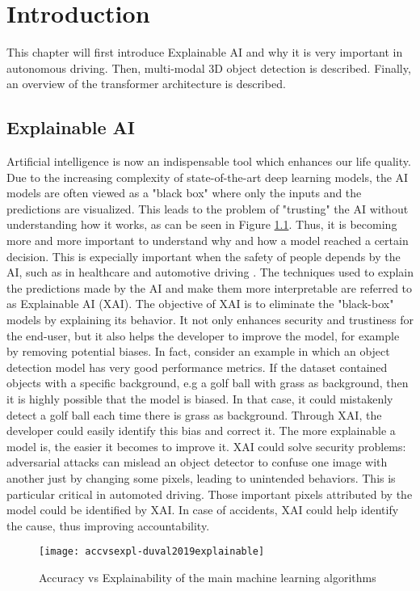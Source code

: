 \chapter{Introduction}
This chapter will first introduce Explainable AI and why it is very important in autonomous driving. Then, multi-modal 3D object detection is described. Finally, an overview of the transformer architecture is described. 

\section{Explainable AI}
Artificial intelligence is now an indispensable tool which enhances our life quality.
Due to the increasing complexity of state-of-the-art deep learning models, the AI models are often viewed as a "black box" where only the inputs and the predictions are visualized. This leads to the problem of "trusting" the AI without understanding how it works, as can be seen in Figure \ref{fig:accvsexpl}. Thus, it is becoming more and more important to understand why and how a model reached a certain decision. This is expecially important when the safety of people depends by the AI, such as in healthcare and automotive driving \cite{abeloos2022explaining}.
The techniques used to explain the predictions made by the AI and make them more interpretable are referred to as Explainable AI (XAI). The objective of XAI is to eliminate the "black-box" models by explaining its behavior.
It not only enhances security and trustiness for the end-user, but it also helps the developer to improve the model, for example by removing potential biases. In fact, consider an example in which an object detection model has very good performance metrics. If the dataset contained objects with a specific background, e.g a golf ball with grass as background, then it is highly possible that the model is biased. In that case, it could mistakenly detect a golf ball each time there is grass as background. Through XAI, the developer could easily identify this bias and correct it.
The more explainable a model is, the easier it becomes to improve it. 
XAI could solve security problems: adversarial attacks can mislead an object detector to confuse one image with another just by changing some pixels, leading to unintended behaviors. This is particular critical in automoted driving. Those important pixels attributed by the model could be identified by XAI.
In case of accidents, XAI could help identify the cause, thus improving accountability.
\begin{figure}[h]
    \centering
    \texttt{[image: accvsexpl-duval2019explainable]}
    \caption{Accuracy vs Explainability of the main machine learning algorithms \cite{duval2019explainable}}
    \label{fig:accvsexpl}
    \end{figure}


